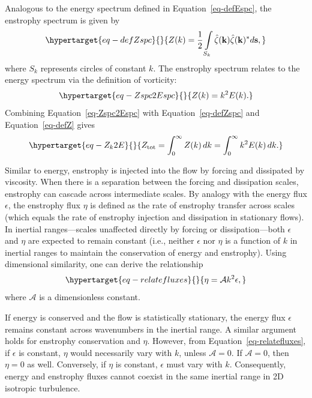 \documentclass[
  letterpaper,
  twocolumn,
  landscape]{report}
\begin{document}
Analogous to the energy spectrum defined in Equation~\ref{eq-defEspc},
the enstrophy spectrum is given by
\begin{equation}\protect\hypertarget{eq-defZspc}{}{
Z(k) =\frac{1}{2} \int\limits_{S_k} \hat{\zeta}(\mathbf{k}) \hat{\zeta}(\mathbf{k})^* d \mathbf{s},
}\label{eq-defZspc}\end{equation} where \(S_k\) represents circles of
constant \(k\). The enstrophy spectrum relates to the energy spectrum
via the definition of vorticity:
\begin{equation}\protect\hypertarget{eq-Zspc2Espc}{}{
Z(k) = k^2 E(k).
}\label{eq-Zspc2Espc}\end{equation} Combining
Equation~\ref{eq-Zspc2Espc} with Equation~\ref{eq-defZspc} and
Equation~\ref{eq-defZ} gives
\begin{equation}\protect\hypertarget{eq-Z_k2E}{}{
Z_{\text{tot}} = \int_0^\infty Z(k)\, d k = \int_0^\infty k^2 E(k)\, d k.
}\label{eq-Z_k2E}\end{equation}

Similar to energy, enstrophy is injected into the flow by forcing and
dissipated by viscosity. When there is a separation between the forcing
and dissipation scales, enstrophy can cascade across intermediate
scales. By analogy with the energy flux \(\epsilon\), the enstrophy flux
\(\eta\) is defined as the rate of enstrophy transfer across scales
(which equals the rate of enstrophy injection and dissipation in
stationary flows). In inertial ranges---scales unaffected directly by
forcing or dissipation---both \(\epsilon\) and \(\eta\) are expected to
remain constant (i.e., neither \(\epsilon\) nor \(\eta\) is a function
of \(k\) in inertial ranges to maintain the conservation of energy and
enstrophy). Using dimensional similarity, one can derive the
relationship \begin{equation}\protect\hypertarget{eq-relatefluxes}{}{ 
\eta = \mathcal{A} k^2 \epsilon,
}\label{eq-relatefluxes}\end{equation} where \(\mathcal{A}\) is a
dimensionless constant.

If energy is conserved and the flow is statistically stationary, the
energy flux \(\epsilon\) remains constant across wavenumbers in the
inertial range. A similar argument holds for enstrophy conservation and
\(\eta\). However, from Equation~\ref{eq-relatefluxes}, if \(\epsilon\)
is constant, \(\eta\) would necessarily vary with \(k\), unless
\(\mathcal{A} = 0\). If \(\mathcal{A} = 0\), then \(\eta = 0\) as well.
Conversely, if \(\eta\) is constant, \(\epsilon\) must vary with \(k\).
Consequently, energy and enstrophy fluxes cannot coexist in the same
inertial range in 2D isotropic turbulence.
\end{document}
